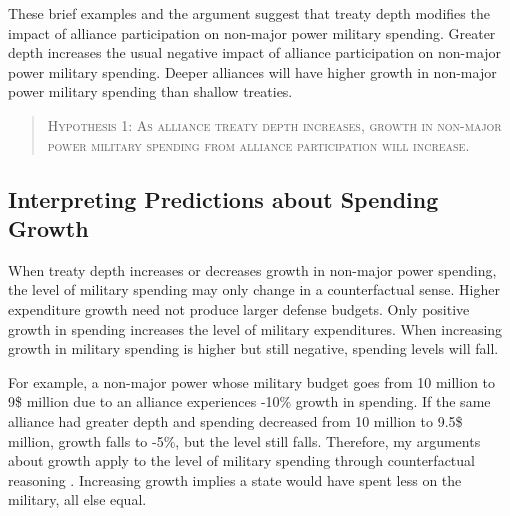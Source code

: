\documentclass[12pt]{article}
\begin{document}
 
These brief examples and the argument suggest that treaty depth modifies the impact of alliance participation on non-major power military spending. 
Greater depth increases the usual negative impact of alliance participation on non-major power military spending. 
Deeper alliances will have higher growth in non-major power military spending than shallow treaties. 
 

\begin{quote}
\textsc{Hypothesis 1: As alliance treaty depth increases, growth in non-major power military spending from alliance participation will increase.}
\end{quote}



\subsection{Interpreting Predictions about Spending Growth}


When treaty depth increases or decreases growth in non-major power spending, the level of military spending may only change in a counterfactual sense. 
Higher expenditure growth need not produce larger defense budgets. 
Only positive growth in spending increases the level of military expenditures. 
When increasing growth in military spending is higher but still negative, spending levels will fall. 


For example, a non-major power whose military budget goes from 10 million to 9\$ million due to an alliance experiences -10\% growth in spending. 
If the same alliance had greater depth and spending decreased from 10 million to 9.5\$ million, growth falls to -5\%, but the level still falls. 
Therefore, my arguments about growth apply to the level of military spending through counterfactual reasoning \cite{Fearon1991}. 
Increasing growth implies a state would have spent less on the military, all else equal.
\end{document}
